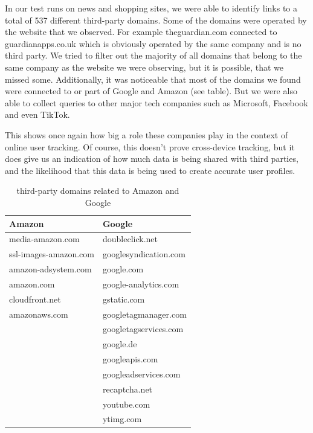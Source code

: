In our test runs on news and shopping sites, we were able to identify links to a total of 537 different third-party domains. Some of the domains were operated by the website that we observed. For example theguardian.com connected to guardianapps.co.uk which is obviously operated by the same company and is no third party. We tried to filter out the majority of all domains that belong to the same company as the website we were observing, but it is possible, that we missed some. Additionally, it was noticeable that most of the domains we found were connected to or part of Google and Amazon (see table). But we were also able to collect queries to other major tech companies such as Microsoft, Facebook and even TikTok. 

This shows once again how big a role these companies play in the context of online user tracking. Of course, this doesn't prove cross-device tracking, but it does give us an indication of how much data is being shared with third parties, and the likelihood that this data is being used to create accurate user profiles.
\begin{table}[ht]
\small
\centering
\begin{tabularx}{0.6\textwidth}{|X|X|}
\hline
\textbf{Amazon} & \textbf{Google} \\
\hline
media-amazon.com & doubleclick.net \\
ssl-images-amazon.com & googlesyndication.com \\
amazon-adsystem.com & google.com \\
amazon.com & google-analytics.com \\
cloudfront.net & gstatic.com \\
amazonaws.com & googletagmanager.com \\
 & googletagservices.com \\
 & google.de \\
 & googleapis.com \\
 & googleadservices.com \\
 & recaptcha.net \\
 & youtube.com \\
 & ytimg.com \\
\hline
\end{tabularx}
\caption{third-party domains related to Amazon and Google}
\label{tab:third-party-domains}
\end{table}

